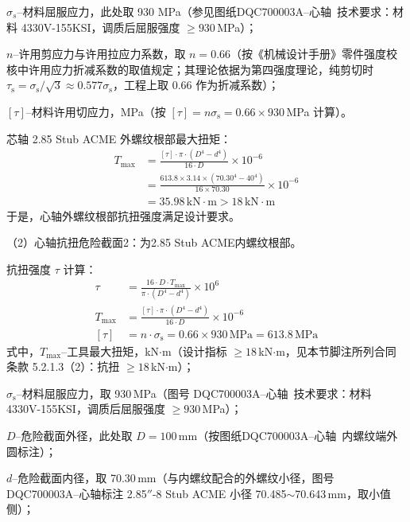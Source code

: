 $\sigma_s$--材料屈服应力，此处取 930 MPa（参见图纸DQC700003A--心轴\ 技术要求：材料 4330V-155KSI，调质后屈服强度 $\ge 930$\,MPa）；

$n$--许用剪应力与许用拉应力系数，取 $n = 0.66$（按《机械设计手册》零件强度校核中许用应力折减系数的取值规定\cite{ref26}；其理论依据为第四强度理论，纯剪切时 $\tau_{\mathrm{s}} = \sigma_{\mathrm{s}}/\sqrt{3} \approx 0.577\sigma_{\mathrm{s}}$，工程上取 $0.66$ 作为折减系数）；

$[\tau]$--材料许用切应力，MPa（按 $[\tau]=n\sigma_{\mathrm{s}} = 0.66\times 930$\,MPa 计算）。

芯轴 2.85 Stub ACME 外螺纹根部最大扭矩：
\begin{equation}
    \begin{aligned}
        T_{\max} &= \frac{[\tau] \cdot \pi \cdot (D^4 - d^4)}{16 \cdot D} \times 10^{-6} \\
                &= \frac{613.8 \times 3.14 \times (70.30^4 - 40^4)}{16 \times 70.30} \times 10^{-6} \\
                &= 35.98\,\text{kN}\cdot\text{m} > 18\,\text{kN}\cdot\text{m}
    \end{aligned}
\end{equation}
于是，心轴外螺纹根部抗扭强度满足设计要求。

（2）心轴抗扭危险截面2：为2.85 Stub ACME内螺纹根部。

抗扭强度 $\tau$ 计算：
\begin{equation}
    \begin{aligned}
        \tau &= \frac{16 \cdot D \cdot T_{\max}}{\pi \cdot (D^4 - d^4)} \times 10^6 \\
        T_{\max} &= \frac{[\tau] \cdot \pi \cdot (D^4 - d^4)}{16 \cdot D} \times 10^{-6} \\
        [\tau] &= n \cdot \sigma_{\mathrm{s}} = 0.66 \times 930\,\text{MPa} = 613.8\,\text{MPa}
    \end{aligned}
\end{equation}
式中，$T_{\max}$--工具最大扭矩，kN$\cdot$m（设计指标 $\ge 18$\,kN$\cdot$m，见本节脚注所列合同条款 5.2.1.3（2）：抗扭 $\ge 18$\,kN$\cdot$m）；

$\sigma_{\mathrm{s}}$--材料屈服应力，取 930\,MPa（图号 DQC700003A--心轴\ 技术要求：材料 4330V-155KSI，调质后屈服强度 $\ge 930$\,MPa）；

$D$--危险截面外径，此处取 $D = 100\,\text{mm}$（按图纸DQC700003A--心轴\ 内螺纹端外圆标注）；

$d$--危险截面内径，取 70.30\,mm（与内螺纹配合的外螺纹小径，图号 DQC700003A--心轴标注 2.85$''$-8 Stub ACME 小径 70.485$\sim$70.643\,mm，取小值侧）；

